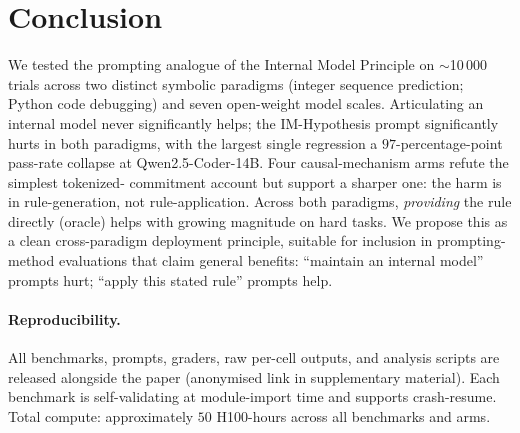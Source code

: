 \documentclass{article}
\begin{document}
\section{Conclusion}
\label{sec:conc}

We tested the prompting analogue of the Internal Model Principle
on $\sim$10\,000 trials across two distinct symbolic paradigms
(integer sequence prediction; Python code debugging) and seven
open-weight model scales.  Articulating an internal model never
significantly helps; the IM-Hypothesis prompt significantly
hurts in both paradigms, with the largest single regression a
$97$-percentage-point pass-rate collapse at Qwen2.5-Coder-14B.
Four causal-mechanism arms refute the simplest tokenized-
commitment account but support a sharper one:  the harm is in
rule-generation, not rule-application.  Across both paradigms,
\emph{providing} the rule directly (oracle) helps with growing
magnitude on hard tasks.  We propose this as a clean
cross-paradigm deployment principle, suitable for inclusion in
prompting-method evaluations that claim general benefits:
``maintain an internal model'' prompts hurt;  ``apply this
stated rule'' prompts help.

\paragraph{Reproducibility.}
All benchmarks, prompts, graders, raw per-cell outputs, and
analysis scripts are released alongside the paper
(anonymised link in supplementary material).  Each benchmark is
self-validating at module-import time and supports
crash-resume.  Total compute: approximately $50$ H100-hours
across all benchmarks and arms.
\end{document}
